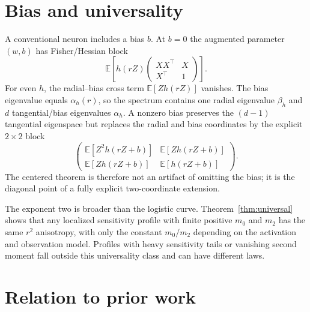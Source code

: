 \documentclass[11pt]{article}
\newcommand{\E}{\mathbb E}
\begin{document}
\section{Bias and universality}

A conventional neuron includes a bias $b$.  At $b=0$ the augmented parameter $(w,b)$ has Fisher/Hessian block
\[
 \E\!\left[h(rZ)
 \begin{pmatrix}XX^\top&X\\X^\top&1\end{pmatrix}\right].
\]
For even $h$, the radial--bias cross term $\E[Zh(rZ)]$ vanishes.  The bias eigenvalue equals $\alpha_h(r)$, so
the spectrum contains one radial eigenvalue $\beta_h$ and $d$ tangential/bias eigenvalues $\alpha_h$.  A nonzero
bias preserves the $(d-1)$ tangential eigenspace but replaces the radial and bias coordinates by the explicit
$2\times2$ block
\begin{equation}
 \begin{pmatrix}
  \E[Z^2h(rZ+b)] & \E[Zh(rZ+b)]\\
  \E[Zh(rZ+b)] & \E[h(rZ+b)]
 \end{pmatrix}.
 \label{eq:biasblock}
\end{equation}
The centered theorem is therefore not an artifact of omitting the bias; it is the diagonal point of a fully explicit
two-coordinate extension.

The exponent two is broader than the logistic curve.  Theorem~\ref{thm:universal} shows that any localized
sensitivity profile with finite positive $m_0$ and $m_2$ has the same $r^2$ anisotropy, with only the constant
$m_0/m_2$ depending on the activation and observation model.  Profiles with heavy sensitivity tails or vanishing
second moment fall outside this universality class and can have different laws.



\section{Relation to prior work}
\end{document}

